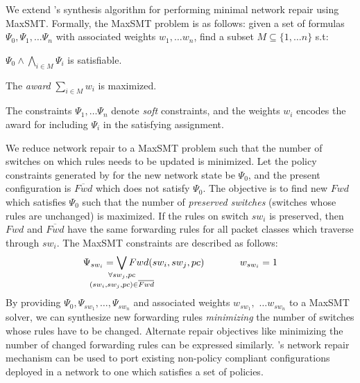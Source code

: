 We extend \name's synthesis algorithm for performing
minimal network repair using MaxSMT.  
Formally, the MaxSMT problem is as follows: given a set
of formulas $\Psi_0, \Psi_1, \ldots \Psi_n$ with associated 
weights $w_1, \ldots w_n$, find a subset $M \subseteq \{1, \ldots n\}$
s.t: 
\begin{compactenumerate}
	\item $\Psi_0 \wedge \bigwedge_{i \in M} \Psi_i$ is satisfiable.
	\item The \emph{award} $\sum_{i \in M} w_i$  is maximized.
\end{compactenumerate}
The constraints $\Psi_1, \ldots \Psi_n$ denote \emph{soft} constraints, and
the weights $w_i$ encodes the award for including $\Psi_i$ in the satisfying
assignment. 

We reduce network repair to a MaxSMT problem
such that 
the number of switches on which rules needs to be updated is minimized.
 Let
the policy constraints generated by \name for the new network state be $\Psi_0$, and the present 
configuration is $\overline{Fwd}$ which does not satisfy $\Psi_0$. The 
objective is to find new $Fwd$ which satisfies $\Psi_0$ such that the number of \emph{preserved switches} (switches whose rules are unchanged) 
is maximized. If the rules on switch $sw_i$ is preserved, then $Fwd$ and $\overline{Fwd}$ have the same forwarding rules for all packet classes which
traverse through $sw_i$. The MaxSMT constraints are described as follows:
\begin{equation}
	\Psi_{sw_i} =  
	  \bigvee_{\mathclap{\substack{\forall sw_j, pc \\
			  		(sw_i, sw_j, pc) \in \overline{Fwd}}}} Fwd(sw_i, sw_j, pc) 
			~~~~~~~~~~~ 
			w_{sw_i}= 1
\end{equation}
By providing $\Psi_0, \Psi_{sw_1}, \ldots, \Psi_{sw_n}$  and associated weights 
$w_{sw_1},$ $\ldots w_{sw_n}$
to a MaxSMT solver, we can synthesize new forwarding rules  
\emph{minimizing} the number of switches whose rules have to be changed. 
Alternate
repair objectives like minimizing the number of changed forwarding rules 
can be expressed similarly. \name's network repair mechanism
 can be used to
port existing non-policy compliant configurations deployed in a network  to one which satisfies a set of policies.

